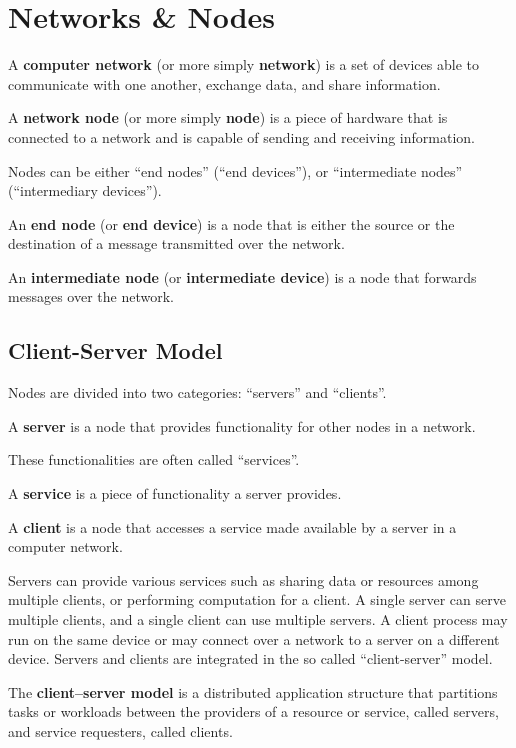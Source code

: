 \section{Networks \& Nodes}

A \textbf{computer network} (or more simply \textbf{network}) is a set of devices able to communicate with one another,
exchange data, and share information.
\ed

A \textbf{network node} (or more simply \textbf{node}) is a piece of hardware that is connected to a network and is
capable of sending and receiving information.
\ed

Nodes can be either ``end nodes'' (``end devices''), or ``intermediate nodes'' (``intermediary devices'').

An \textbf{end node} (or \textbf{end device}) is a node that is either the source or the destination of a message 
transmitted over the network.
\ed

An \textbf{intermediate node} (or \textbf{intermediate device}) is a node that forwards messages over the network.
\ed

\subsection{Client-Server Model}

Nodes are divided into two categories: ``servers'' and ``clients''.

\bd[Server]
A \textbf{server} is a node that provides functionality for other nodes in a network.
\ed

These functionalities are often called ``services''.

\bd[Service]
A \textbf{service} is a piece of functionality a server provides.
\ed

\bd[Client]
A \textbf{client} is a node that accesses a service made available by a server in a computer network.
\ed

Servers can provide various services such as sharing data or resources among multiple clients, or performing
computation for a client. A single server can serve multiple clients, and a single client can use multiple servers. A
client process may run on the same device or may connect over a network to a server on a different device. Servers
and clients are integrated in the so called ``client-server'' model.

The \textbf{client–server model} is a distributed application structure that partitions tasks or workloads between the
providers of a resource or service, called servers, and service requesters, called clients.
\ed

